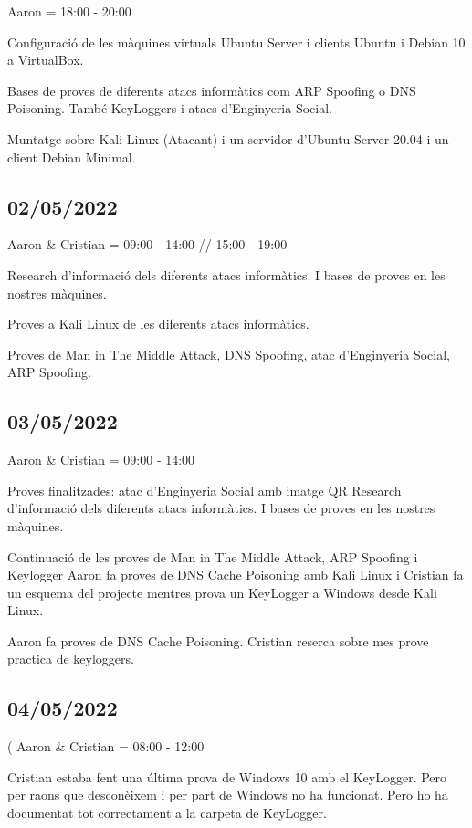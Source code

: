 \documentclass[]{article}
\begin{document}
Aaron = 18:00 - 20:00

Configuració de les màquines virtuals Ubuntu Server i clients Ubuntu i
Debian 10 a VirtualBox.

Bases de proves de diferents atacs informàtics com ARP Spoofing o DNS
Poisoning. També KeyLoggers i atacs d'Enginyeria Social.

Muntatge sobre Kali Linux (Atacant) i un servidor d'Ubuntu Server 20.04
i un client Debian Minimal.

\hypertarget{section-6}{%
\subsection{02/05/2022}\label{section-6}}

Aaron \& Cristian = 09:00 - 14:00 // 15:00 - 19:00

Research d'informació dels diferents atacs informàtics. I bases de
proves en les nostres màquines.

Proves a Kali Linux de les diferents atacs informàtics.

Proves de Man in The Middle Attack, DNS Spoofing, atac d'Enginyeria
Social, ARP Spoofing.

\hypertarget{section-7}{%
\subsection{03/05/2022}\label{section-7}}

Aaron \& Cristian = 09:00 - 14:00

Proves finalitzades: atac d'Enginyeria Social amb imatge QR Research
d'informació dels diferents atacs informàtics. I bases de proves en les
nostres màquines.

Continuació de les proves de Man in The Middle Attack, ARP Spoofing i
Keylogger Aaron fa proves de DNS Cache Poisoning amb Kali Linux i
Cristian fa un esquema del projecte mentres prova un KeyLogger a Windows
desde Kali Linux.

Aaron fa proves de DNS Cache Poisoning. Cristian reserca sobre mes prove
practica de keyloggers.

\hypertarget{section-8}{%
\subsection{04/05/2022}\label{section-8}}

( Aaron \& Cristian = 08:00 - 12:00

Cristian estaba fent una última prova de Windows 10 amb el KeyLogger.
Pero per raons que desconèixem i per part de Windows no ha funcionat.
Pero ho ha documentat tot correctament a la carpeta de KeyLogger.
\end{document}
